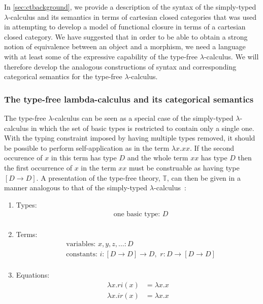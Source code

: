 \documentclass[10pt]{article}
\theoremstyle{plain}
\theoremstyle{definition}
\theoremstyle{remark}
\begin{document}
In \ref{sec:ctbackground}, we provide a description of the syntax of the simply-typed $\lambda$-calculus and its semantics in terms of cartesian closed categories that was used in attempting to develop a model of functional closure in terms of a cartesian closed category. We have suggested that in order to be able to obtain a strong notion of equivalence between an object and a morphism, we need a language with at least some of the expressive capability of the type-free $\lambda$-calculus. We will therefore develop the analogous constructions of syntax and corresponding categorical semantics for the type-free $\lambda$-calculus.

\subsubsection{The type-free lambda-calculus and its categorical semantics}
The type-free $\lambda$-calculus can be seen as a special case of the simply-typed $\lambda$-calculus in which the set of basic types is restricted to contain only a single one. With the typing constraint imposed by having multiple types removed, it should be possible to perform self-application as in the term $\lambda x. xx$. If the second occurence of $x$ in this term has type $D$ and the whole term $xx$ has type $D$ then the first occurrence of $x$ in the term $xx$ must be construable as having type $[D \rightarrow D]$. A presentation of the type-free theory, $\mathbb{T}$, can then be given in a manner analogous to that of the simply-typed $\lambda$-calculus~\cite{Awodey2000}:
\begin{enumerate}
\item{Types:}
\begin{align*}
&\mbox{one basic type: } D\\
\end{align*}
\item{Terms:}
\begin{align*}
&\mbox{variables: } x,y,z, \ldots \colon D\\
&\mbox{constants: } i \colon [D \rightarrow D] \rightarrow D,\,\, r \colon D \rightarrow [D \rightarrow D]\\
\end{align*}
\item{Equations:}
\begin{align*}
            \lambda x. ri(x) &= \lambda x.x\\
            \lambda x. ir(x) &= \lambda x.x
\end{align*}
\end{enumerate}
\end{document}
